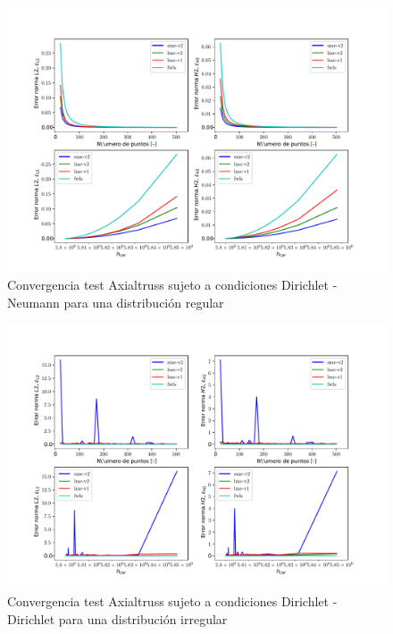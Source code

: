 \begin{figure}
    \centering
    \includegraphics[width=1\textwidth]{./Imagenes/06/comparacion_shp_regular/Axialtruss_regular_type-2_caso-3_direct_dgesv-lapack-blas_sme-v2_lme-v2_lme-v1_fwls.pdf}
    \caption{Convergencia test Axialtruss sujeto a condiciones Dirichlet - Neumann para una distribución regular} \label{fig:Axialtruss_caso-3_conv}
\end{figure}
\begin{figure}
    \centering
    \includegraphics[width=1\textwidth]{./Imagenes/06/comparacion_shp_irreg/Axialtruss_irreg_type-2_caso-1_direct_dgesv-lapack-blas_sme-v2_lme-v2_lme-v1_fwls.pdf}
    \caption{Convergencia test Axialtruss sujeto a condiciones Dirichlet - Dirichlet para una distribución irregular} \label{fig:Axialtruss_caso-1_conv_irreg}
\end{figure}
